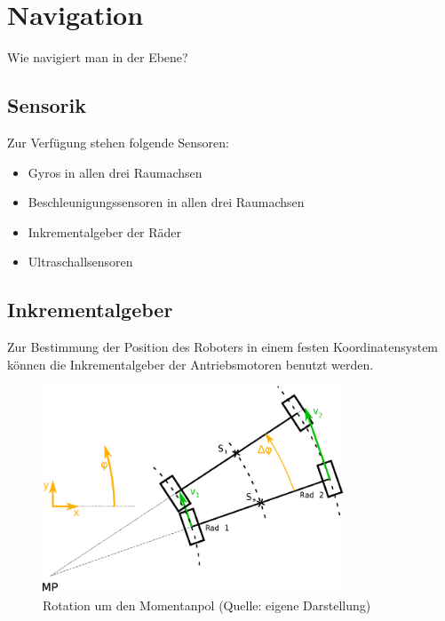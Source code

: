 \renewcommand{\autoren}{Stephan Morongowski}
\newpage
\section{Navigation}

Wie navigiert man in der Ebene?

\subsection{Sensorik}
Zur Verfügung stehen folgende Sensoren:
\begin{itemize}
\item Gyros in allen drei Raumachsen
\item Beschleunigungssensoren in allen drei Raumachsen
\item Inkrementalgeber der Räder
\item Ultraschallsensoren
\end{itemize}

\subsection{Inkrementalgeber}

Zur Bestimmung der Position des Roboters in einem festen Koordinatensystem können die Inkrementalgeber der Antriebsmotoren benutzt werden.

\begin{figure}[h]  %
\centering\includegraphics[width=0.8\textwidth]{images/Kurvenkinematic.eps}
\caption{Rotation um den Momentanpol \newline (Quelle: eigene Darstellung)}
\label{kurvenkinematik}
\end{figure}

